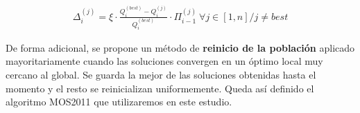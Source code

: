 \begin{equation}\label{eq:RatioCompensacion}
	\begin{gathered}
		\Delta_i^{(j)} = \xi \cdot \frac{Q_i^{(best)} - Q_i^{(j)}} {Q_i^{(best)}} \cdot \Pi_{i-1}^{(j)} \ \forall j \in [1,n]/j \neq best
	\end{gathered}
\end{equation}

De forma adicional, se propone un método de \textbf{reinicio de la población} aplicado mayoritariamente cuando las soluciones convergen en un óptimo local muy cercano al global. Se guarda la mejor de las soluciones obtenidas hasta el momento y el resto se reinicializan uniformemente. Queda así definido el algoritmo MOS2011 que utilizaremos en este estudio.




















































